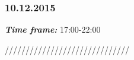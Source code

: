 \subsubsection{10.12.2015}
\textit{\textbf{Time frame:}} 17:00-22:00 

//////////////////////////////

